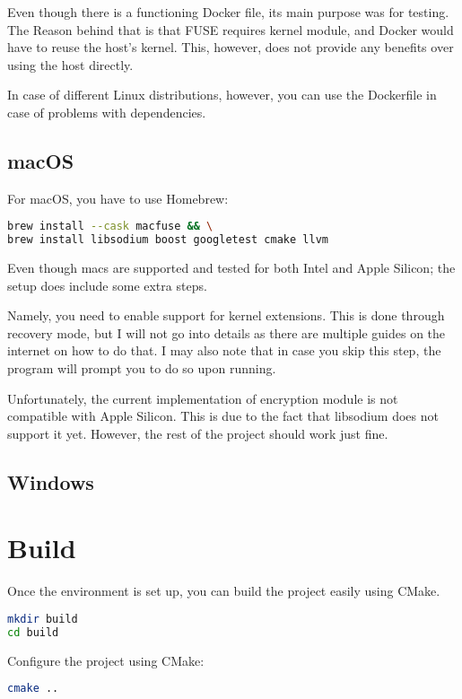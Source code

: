 Even though there is a functioning Docker file, its main purpose was for testing.
The Reason behind that is that FUSE requires kernel module, and Docker would have to reuse the host's kernel.
This, however, does not provide any benefits over using the host directly.

In case of different Linux distributions, however, you can use the Dockerfile in case of problems with dependencies.

\subsection*{macOS}

For macOS, you have to use Homebrew:

\begin{lstlisting}[language=bash, basicstyle=\ttfamily\small]
brew install --cask macfuse && \
brew install libsodium boost googletest cmake llvm
\end{lstlisting}

Even though macs are supported and tested for both Intel and Apple Silicon; the setup does include some extra steps.

Namely, you need to enable support for kernel extensions.
This is done through recovery mode, but I will not go into details as there are multiple guides on the internet on how to do that\cite{macos-kext}.
I may also note that in case you skip this step, the program will prompt you to do so upon running.

Unfortunately, the current implementation of encryption module is not compatible with Apple Silicon.
This is due to the fact that libsodium does not support it yet.
However, the rest of the project should work just fine.

\subsection*{Windows}


\section{Build}\label{sec:build}

Once the environment is set up, you can build the project easily using CMake.

\begin{lstlisting}[language=bash, basicstyle=\ttfamily\small]
mkdir build
cd build
\end{lstlisting}

\noindent Configure the project using CMake:

\begin{lstlisting}[language=bash, basicstyle=\ttfamily\small]
cmake ..
\end{lstlisting}

